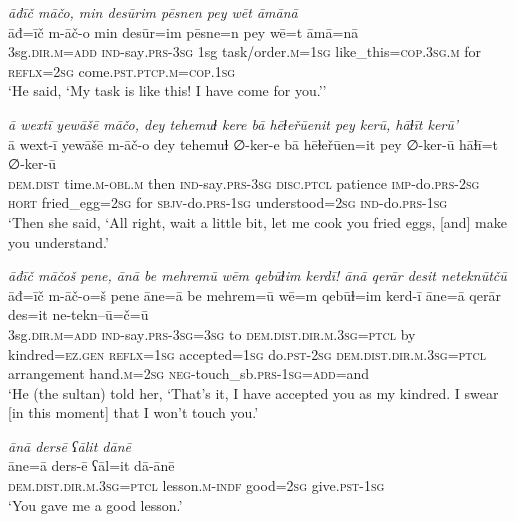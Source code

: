 \ea \label{ŽH.78}
\textit{āđīč māčo, min desūrim pēsnen pey wēt āmānā} \\ 
\gll āđ=īč m-āč-o min desūr=im pēsne=n pey wē=t āmā=nā \\ 
 3sg\textsc{.dir}\textsc{.m}\textsc{=add} \textsc{ind-}say\textsc{.prs}\textsc{-3sg} 1sg task/order\textsc{.m}\textsc{=1sg} like\_this\textsc{=cop}\textsc{.3sg}\textsc{.m} for \textsc{reflx}\textsc{=\textsc{2sg}} come\textsc{.pst}\textsc{.ptcp}\textsc{.m}\textsc{=cop}\textsc{.1sg} \\ 
\glt `He said, ‘My task is like this! I have come for you.’'
\z 
 
\ea \label{ŽH.79}
\textit{ā wextī yewāšē māčo, dey tehemuɫ kere bā hēɫeřūenit pey kerū, hāɫīt kerū'} \\ 
\gll ā wext-ī yewāšē m-āč-o dey tehemuɫ ∅-ker-e bā hēɫeřūen=it pey ∅-ker-ū hāɫī=t ∅-ker-ū \\ 
 \textsc{dem.dist} time\textsc{.m}\textsc{-obl}\textsc{.m} then \textsc{ind-}say\textsc{.prs}\textsc{-3sg} \textsc{disc.ptcl} patience \textsc{imp-}do\textsc{.prs}-\textsc{2sg} \textsc{hort} fried\_egg\textsc{=\textsc{2sg}} for \textsc{sbjv-}do\textsc{.prs}\textsc{-1sg} understood\textsc{=\textsc{2sg}} \textsc{ind-}do\textsc{.prs}\textsc{-1sg} \\ 
\glt `Then she said, ‘All right, wait a little bit, let me cook you fried eggs, [and] make you understand.'
\z 
 
\ea \label{ŽH.103}
\textit{āđīč māčoš pene, ānā be mehremū wēm qebūɫim kerdī! ānā qerār desit neteknūtčū} \\ 
\gll āđ=īč m-āč-o=š pene āne=ā be mehrem=ū wē=m qebūɫ=im kerd-ī āne=ā qerār des=it ne-tekn--ū=č=ū \\ 
 3sg\textsc{.dir}\textsc{.m}\textsc{=add} \textsc{ind-}say\textsc{.prs}\textsc{-3sg}\textsc{=3sg} to \textsc{dem.dist}\textsc{.dir}\textsc{.m}\textsc{.3sg}=\textsc{ptcl} by kindred\textsc{=ez}\textsc{.gen} \textsc{reflx}\textsc{=1sg} accepted\textsc{=1sg} do\textsc{.pst}-\textsc{2sg} \textsc{dem.dist}\textsc{.dir}\textsc{.m}\textsc{.3sg}=\textsc{ptcl} arrangement hand\textsc{.m}\textsc{=\textsc{2sg}} \textsc{neg-}touch\_sb\textsc{.prs}\textsc{-1sg}\textsc{=add}=and \\ 
\glt `He (the sultan) told her, ‘That’s it, I have accepted you as my kindred. I swear [in this moment] that I won’t touch you.'
\z 
 
\ea \label{ŽH.104}
\textit{ānā dersē ʕālit dānē} \\ 
\gll āne=ā ders-ē ʕāl=it dā-ānē \\ 
 \textsc{dem.dist}\textsc{.dir}\textsc{.m}\textsc{.3sg}=\textsc{ptcl} lesson\textsc{.m}\textsc{-indf} good\textsc{=\textsc{2sg}} give\textsc{.pst}\textsc{-1sg} \\ 
\glt `You gave me a good lesson.'
\z 
 
